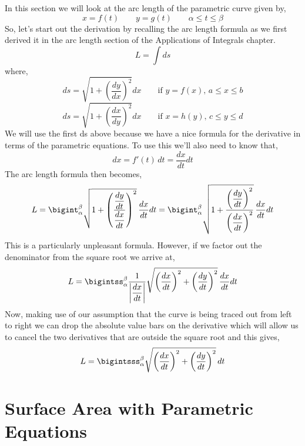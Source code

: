 \documentclass[10pt,reqno]{book}
\theoremstyle{definition}
\begin{document}
	In this section we will look at the arc length of the parametric curve given by,
	\[ x = f(t) \qquad y = g(t) \qquad \alpha \leq t \leq \beta \]
	So, let's start out the derivation by recalling the arc length formula as we first derived it in the arc length section of the Applications of Integrals chapter.
	\[ L = \int ds \]
	where, 
	\[ ds = \sqrt{1 + \left(\frac{dy}{dx}\right)^2}dx \qquad \text{if } y = f(x), \, a \leq x \leq b \]
	\[ ds = \sqrt{1 + \left(\frac{dx}{dy}\right)^2}dx \qquad \text{if } x = h(y), \, c \leq y \leq d \]
	We will use the first ds above because we have a nice formula for the derivative in terms of the parametric equations. To use this we'll also need to know that,
	\[ dx = f'(t)\,dt = \frac{dx}{dt}dt \]
	The arc length formula then becomes,
	\[ L = \bigint_{\alpha}^{\beta} \sqrt{1 + \left( \frac{\dfrac{dy}{dt}}{\dfrac{dx}{dt}} \right)^2} \,  \frac{dx}{dt}dt = \bigint_{\alpha}^{\beta} \sqrt{1 + \frac{\left(\dfrac{dy}{dt} \right)^2}{\left( \dfrac{dx}{dt} \right)^2}} \, \frac{dx}{dt} dt \]
	This is a particularly unpleasant formula. However, if we factor out the denominator from the square root we arrive at,
	\[ L = \bigintss_{\alpha}^{\beta} \frac{1}{ \left| \dfrac{dx}{dt} \right| } \sqrt{ \left( \dfrac{dx}{dt} \right)^2 + \left( \dfrac{dy}{dt} \right)^2 } \, \frac{dx}{dt} dt  \]
	Now, making use of our assumption that the curve is being traced out from left to right we can drop the absolute value bars on the derivative which will allow us to cancel the two derivatives that are outside the square root and this gives,
	\[ L = \bigintsss_{\alpha}^{\beta} \sqrt{ \left( \dfrac{dx}{dt} \right)^2 + \left( \dfrac{dy}{dt} \right)^2 } \, dt  \]
	
	\section{Surface Area with Parametric Equations}
	
\end{document}
